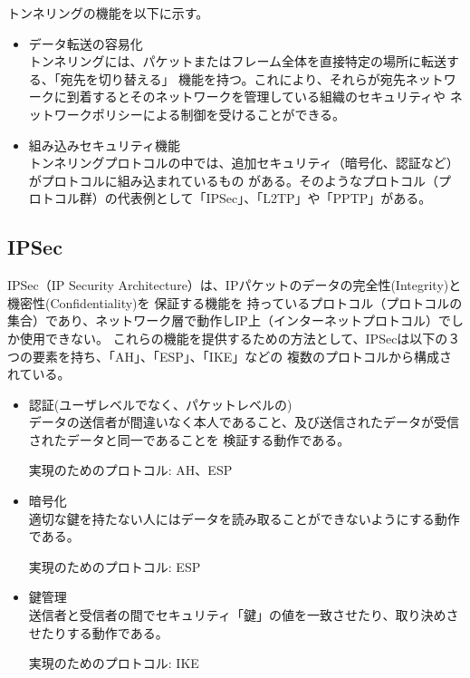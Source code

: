 \documentclass[11pt,a4j,titlepage]{jreport}
\begin{document}
\par トンネリングの機能を以下に示す。
\begin{itemize}
    \item データ転送の容易化 \mbox{}\\
    トンネリングには、パケットまたはフレーム全体を直接特定の場所に転送する、「宛先を切り替える」
    機能を持つ。これにより、それらが宛先ネットワークに到着するとそのネットワークを管理している組織のセキュリティや
    ネットワークポリシーによる制御を受けることができる。
    \item 組み込みセキュリティ機能\mbox{}\\
    トンネリングプロトコルの中では、追加セキュリティ（暗号化、認証など）がプロトコルに組み込まれているもの
    がある。そのようなプロトコル（プロトコル群）の代表例として「IPSec」、「L2TP」や「PPTP」がある。
\end{itemize}


\subsection{IPSec}
IPSec（IP Security Architecture）は、IPパケットのデータの完全性(Integrity)と機密性(Confidentiality)を
保証する機能を
持っているプロトコル（プロトコルの集合）であり、ネットワーク層で動作しIP上（インターネットプロトコル）でしか使用できない。
これらの機能を提供するための方法として、IPSecは以下の３つの要素を持ち、「AH」、「ESP」、「IKE」などの
複数のプロトコルから構成されている。
\begin{itemize}
    \item 認証(ユーザレベルでなく、パケットレベルの)\mbox{}\\
    データの送信者が間違いなく本人であること、及び送信されたデータが受信されたデータと同一であることを
    検証する動作である。\par
    実現のためのプロトコル: AH、ESP
    \item 暗号化\mbox{}\\
    適切な鍵を持たない人にはデータを読み取ることができないようにする動作である。\par
    実現のためのプロトコル: ESP
    \item 鍵管理\mbox{}\\
    送信者と受信者の間でセキュリティ「鍵」の値を一致させたり、取り決めさせたりする動作である。\par
    実現のためのプロトコル: IKE
\end{itemize}
\end{document}
